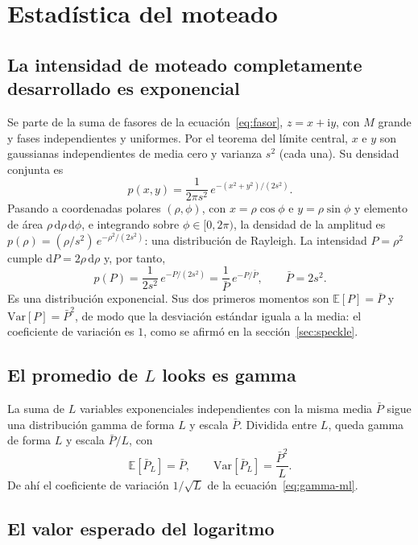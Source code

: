 \documentclass[11pt,a4paper]{article}
\newcommand{\dd}{\mathrm d}
\begin{document}
\section{Estadística del moteado}
\label{sec:der-speckle}

\subsection{La intensidad de moteado completamente desarrollado es exponencial}

Se parte de la suma de fasores de la ecuación~\eqref{eq:fasor}, $z=x+\mathrm{i}y$, con $M$ grande y fases
independientes y uniformes. Por el teorema del límite central, $x$ e $y$ son gaussianas independientes de
media cero y varianza $s^2$ (cada una). Su densidad conjunta es
\[
  p(x,y)=\frac{1}{2\pi s^2}\,e^{-(x^2+y^2)/(2s^2)} .
\]
Pasando a coordenadas polares $(\rho,\phi)$, con $x=\rho\cos\phi$ e $y=\rho\sin\phi$ y elemento de área
$\rho\,\dd\rho\,\dd\phi$, e integrando sobre $\phi\in[0,2\pi)$, la densidad de la amplitud es
$p(\rho)=(\rho/s^2)\,e^{-\rho^2/(2s^2)}$: una distribución de Rayleigh. La intensidad $P=\rho^2$ cumple
$\dd P=2\rho\,\dd\rho$ y, por tanto,
\begin{equation}
  p(P)=\frac{1}{2s^2}\,e^{-P/(2s^2)}=\frac{1}{\bar P}\,e^{-P/\bar P},
  \qquad \bar P=2s^2 .
  \label{eq:der-exp}
\end{equation}
Es una distribución exponencial. Sus dos primeros momentos son $\mathbb{E}[P]=\bar P$ y
$\mathrm{Var}[P]=\bar P^2$, de modo que la desviación estándar iguala a la media: el coeficiente de variación
es $1$, como se afirmó en la sección~\ref{sec:speckle}.

\subsection{El promedio de $L$ looks es gamma}

La suma de $L$ variables exponenciales independientes con la misma media $\bar P$ sigue una distribución gamma
de forma $L$ y escala $\bar P$. Dividida entre $L$, queda gamma de forma $L$ y escala $\bar P/L$, con
\[
  \mathbb{E}[\bar P_L]=\bar P,\qquad
  \mathrm{Var}[\bar P_L]=\frac{\bar P^2}{L}.
\]
De ahí el coeficiente de variación $1/\sqrt L$ de la ecuación~\eqref{eq:gamma-ml}.

\subsection{El valor esperado del logaritmo}
\end{document}

